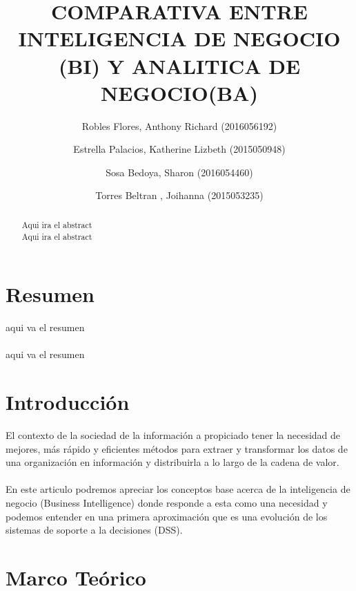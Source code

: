 \documentclass[preprint,12pt]{elsarticle}
\begin{document}
	
	\begin{frontmatter}

		\title{\huge  COMPARATIVA ENTRE INTELIGENCIA DE NEGOCIO (BI) Y ANALITICA DE NEGOCIO(BA) }
		\author{Robles Flores, Anthony Richard	                (2016056192)}
		\author{Estrella Palacios, Katherine Lizbeth			(2015050948)}
		\author{Sosa Bedoya, Sharon					(2016054460)}
		\author{Torres Beltran , Joihanna				(2015053235)}
		\address{Tacna, Perú}
		


\begin{abstract}
Aqui ira el abstract
\\
Aqui ira el abstract
\end{abstract}


\end{frontmatter}

\section{Resumen}
aqui va el resumen
\\
\\
aqui va el resumen


\section{Introducción}
El contexto de la sociedad de la información a propiciado tener la necesidad de mejores, más rápido y eficientes 
métodos para extraer y transformar los datos de una organización en información y distribuirla a lo largo de la 
cadena de valor.
\\
\\
En este articulo podremos apreciar los conceptos base acerca de la inteligencia de negocio (Business Intelligence)
 donde responde a esta como una necesidad y podemos entender en una primera aproximación que es una 
evolución de los sistemas de soporte a la decisiones (DSS).


\section{Marco Teórico}

\end{document}
